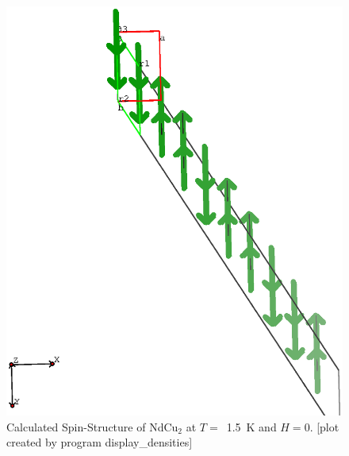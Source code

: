 \begin{figure}[hb]%
\begin{center}\leavevmode
\includegraphics[angle=0, width=1.0\textwidth]{figsrc/ndcu2b/resultss/spinsab.eps}
\end{center}
\caption{Calculated Spin-Structure of NdCu$_2$ at $T=$~1.5~K and $H=0$.
[plot created by program {\prg display\_densities}]}
\label{spingraphic}
\end{figure}





